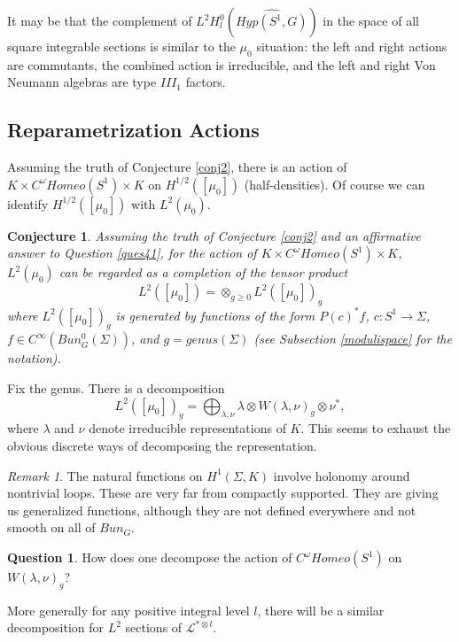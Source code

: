 \documentclass{amsart}
\theoremstyle{conjecture}
\newtheorem{conjecture}{Conjecture}
\theoremstyle{definition}
\theoremstyle{question}
\newtheorem{question}{Question}
\theoremstyle{questions}
\theoremstyle{remark}
\newtheorem*{remark}{Remark}
\theoremstyle{remarks}
\theoremstyle{example}
\numberwithin{equation}{section}
\begin{document}
It may be that the complement of $L^2H^0_l(\widehat{Hyp(S^1,G)})$ in the space of all square integrable sections is similar to the $\mu_0$ situation: the left and right actions are commutants, the combined action is irreducible,
and the left and right Von Neumann algebras are type $III_1$ factors.

\subsection{Reparametrization Actions}

Assuming the truth of Conjecture \ref{conj2}, there is an action of
$K\times C^{\omega}Homeo(S^1)\times K$ on $H^{1/2}([\mu_0])$ (half-densities).
Of course we can identify  $H^{1/2}([\mu_0])$ with $L^2(\mu_0)$.


\begin{conjecture}\label{Virdecomposition} Assuming the truth of Conjecture \ref{conj2} and an affirmative answer to Question \ref{ques41},
for the action of $ K\times C^{\omega}Homeo(S^1)\times K$, $L^2(\mu_0)$ can be regarded as a completion of the tensor
product
$$L^2([\mu_0])=\otimes_{g\ge 0}L^2([\mu_0])_g $$
where $L^2([\mu_0])_g $ is generated by functions of the form $P(c)^*f$, $c:S^1 \to\Sigma$, $f\in C^{\infty}(Bun_G^0(\Sigma))$, and $g=genus(\Sigma)$ (see Subsection \ref{modulispace} for the notation).

\end{conjecture}

Fix the genus. There is a decomposition
$$L^2([\mu_0])_g=\bigoplus_{\lambda ,\nu}\lambda\otimes W(\lambda ,\nu
)_g\otimes\nu^{*},$$
where $\lambda$ and $\nu$ denote irreducible representations of $K$. This seems to exhaust
the obvious discrete ways of decomposing the representation.


\begin{remark} The natural functions on $H^1(\Sigma,K)$ involve holonomy around nontrivial loops. These are very far from compactly supported. They are giving us generalized functions, although they are not defined everywhere and not smooth on all of $Bun_G$.

\end{remark}

\begin{question}

How does one decompose the action of $C^{\omega}Homeo(S^1)$ on $W(\lambda, \nu)_g$?
\end{question}

More generally for any positive integral level $l$, there will be a similar
decomposition for $L^2$ sections of $\mathcal L^{*\otimes l}$.
\end{document}
